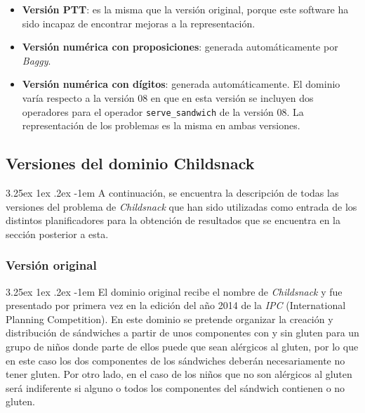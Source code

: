 \documentclass{article}
\makeatletter
\newcommand{\cool}[1] {
        {\texttt{#1}}
    }
\renewcommand\paragraph{\@startsection{paragraph}{5}{\z@}%
      {3.25ex \@plus1ex \@minus.2ex}%
      {-1em}%
      {\normalfont\normalsize\bfseries}}
\makeatother
\begin{document}
\begin{itemize}
        \item \textbf{Versión PTT}: es la misma que la versión original, porque este software ha sido incapaz de encontrar mejoras a la representación.
        \item \textbf{Versión numérica con proposiciones}: generada automáticamente por \textit{Baggy}.
        \item \textbf{Versión numérica con dígitos}: generada automáticamente. El dominio varía respecto a la versión 08 en que en esta versión se incluyen dos operadores para el operador \cool{serve\_sandwich} de la versión 08. La representación de los problemas es la misma en ambas versiones.
    \end{itemize}
    
    \subsection{Versiones del dominio Childsnack}
    
    \paragraph{}
    A continuación, se encuentra la descripción de todas las versiones del problema de \textit{Childsnack} que han sido utilizadas como entrada de los distintos planificadores para la obtención de resultados que se encuentra en la sección posterior a esta.
    
    \subsubsection{Versión original}
    
    \paragraph{}
    El dominio original recibe el nombre de \textit{Childsnack} y fue presentado por
    primera vez en la edición del año 2014 de la \textit{IPC} (International
    Planning Competition). En este dominio se pretende organizar la creación y
    distribución de sándwiches a partir de unos componentes con y sin gluten para un
    grupo de niños donde parte de ellos puede que sean alérgicos al gluten, por lo
    que en este caso los dos componentes de los sándwiches deberán necesariamente no
    tener gluten. Por otro lado, en el caso de los niños que no son alérgicos al
    gluten será indiferente si alguno o todos los componentes del sándwich contienen
    o no gluten.
    
\end{document}
